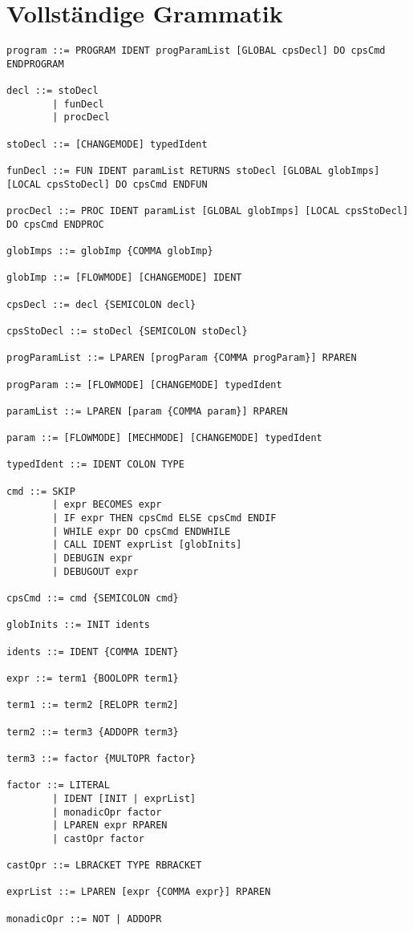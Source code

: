 \documentclass[10pt, a4paper, twocolumn]{article} %
\begin{document}
\clearpage
\appendix
\section{Vollständige Grammatik}
\begin{lstlisting}
program ::= PROGRAM IDENT progParamList [GLOBAL cpsDecl] DO cpsCmd ENDPROGRAM

decl ::= stoDecl
        | funDecl
        | procDecl

stoDecl ::= [CHANGEMODE] typedIdent

funDecl ::= FUN IDENT paramList RETURNS stoDecl [GLOBAL globImps] [LOCAL cpsStoDecl] DO cpsCmd ENDFUN

procDecl ::= PROC IDENT paramList [GLOBAL globImps] [LOCAL cpsStoDecl] DO cpsCmd ENDPROC

globImps ::= globImp {COMMA globImp}

globImp ::= [FLOWMODE] [CHANGEMODE] IDENT

cpsDecl ::= decl {SEMICOLON decl}

cpsStoDecl ::= stoDecl {SEMICOLON stoDecl}

progParamList ::= LPAREN [progParam {COMMA progParam}] RPAREN

progParam ::= [FLOWMODE] [CHANGEMODE] typedIdent

paramList ::= LPAREN [param {COMMA param}] RPAREN

param ::= [FLOWMODE] [MECHMODE] [CHANGEMODE] typedIdent

typedIdent ::= IDENT COLON TYPE

cmd ::= SKIP
        | expr BECOMES expr
        | IF expr THEN cpsCmd ELSE cpsCmd ENDIF
        | WHILE expr DO cpsCmd ENDWHILE
        | CALL IDENT exprList [globInits]
        | DEBUGIN expr
        | DEBUGOUT expr

cpsCmd ::= cmd {SEMICOLON cmd}

globInits ::= INIT idents

idents ::= IDENT {COMMA IDENT}

expr ::= term1 {BOOLOPR term1}

term1 ::= term2 [RELOPR term2]

term2 ::= term3 {ADDOPR term3}

term3 ::= factor {MULTOPR factor}

factor ::= LITERAL
        | IDENT [INIT | exprList]
        | monadicOpr factor
        | LPAREN expr RPAREN
        | castOpr factor

castOpr ::= LBRACKET TYPE RBRACKET

exprList ::= LPAREN [expr {COMMA expr}] RPAREN

monadicOpr ::= NOT | ADDOPR
\end{lstlisting}
\end{document}
